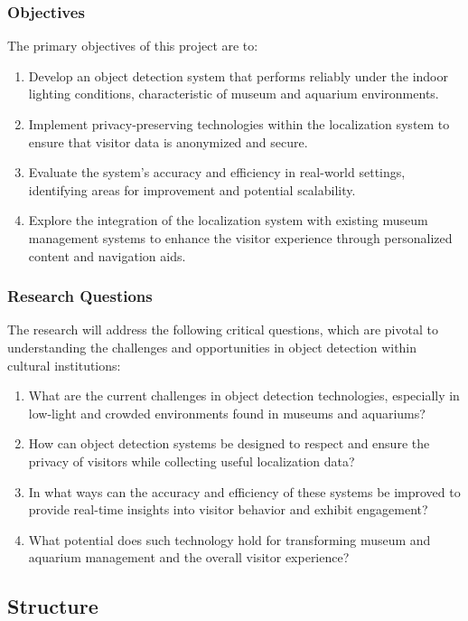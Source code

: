 \subsubsection{Objectives}
\label{sec:primary_objectives}
The primary objectives of this project are to:
\begin{enumerate}
    \item Develop an object detection system that performs reliably under the indoor lighting conditions, characteristic of museum and aquarium environments.
    \item Implement privacy-preserving technologies within the localization system to ensure that visitor data is anonymized and secure.
    \item Evaluate the system's accuracy and efficiency in real-world settings, identifying areas for improvement and potential scalability.
    \item Explore the integration of the localization system with existing museum management systems to enhance the visitor experience through personalized content and navigation aids.
\end{enumerate}

\subsubsection{Research Questions}
\label{sec:research_questions}
The research will address the following critical questions, which are pivotal to understanding the challenges and opportunities in object detection within cultural institutions:
\begin{enumerate}
    \item What are the current challenges in object detection technologies, especially in low-light and crowded environments found in museums and aquariums?
    \item How can object detection systems be designed to respect and ensure the privacy of visitors while collecting useful localization data?
    \item In what ways can the accuracy and efficiency of these systems be improved to provide real-time insights into visitor behavior and exhibit engagement?
    \item What potential does such technology hold for transforming museum and aquarium management and the overall visitor experience?
\end{enumerate}

\subsection{Structure}

